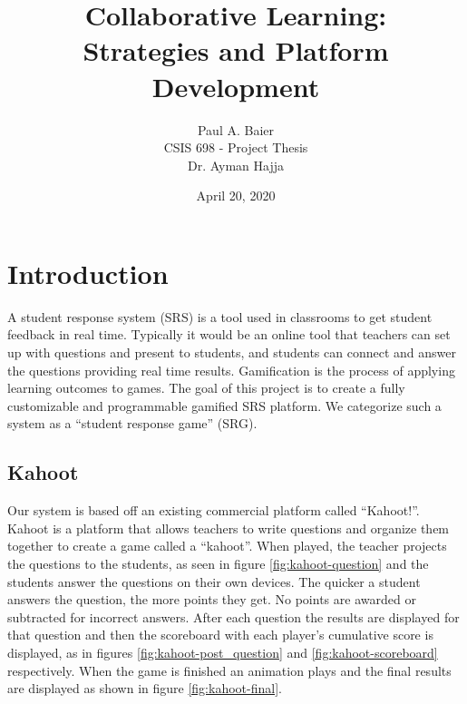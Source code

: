 \documentclass{article}
\title{Collaborative Learning: \\
    \normalsize Strategies and Platform Development
}
\author{Paul A. Baier \\ 
    \footnotesize CSIS 698 - Project Thesis \\
    \footnotesize Dr. Ayman Hajja
}
\date{April 20, 2020}
\begin{document}
\maketitle

\section{Introduction}
    A student response system (SRS) is a tool used in classrooms to get student feedback in real time. Typically it would be an online tool that teachers can set up with questions and present to students, and students can connect and answer the questions providing real time results. Gamification is the process of applying learning outcomes to games. The goal of this project is to create a fully customizable and programmable gamified SRS platform. We categorize such a system as a ``student response game'' (SRG). 

    \subsection{Kahoot} \label{kahoot}
        Our system is based off an existing commercial platform called ``Kahoot!''. Kahoot is a platform that allows teachers to write questions and organize them together to create a game called a ``kahoot''. When played, the teacher projects the questions to the students, as seen in figure \ref{fig:kahoot-question} and the students answer the questions on their own devices. The quicker a student answers the question, the more points they get. No points are awarded or subtracted for incorrect answers. After each question the results are displayed for that question and then the scoreboard with each player's cumulative score is displayed, as in figures \ref{fig:kahoot-post_question} and \ref{fig:kahoot-scoreboard} respectively. When the game is finished an animation plays and the final results are displayed as shown in figure \ref{fig:kahoot-final}.
        
\end{document}
